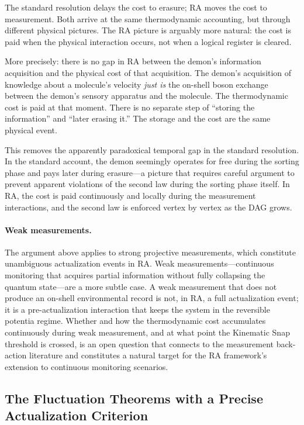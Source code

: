 \documentclass[11pt,a4paper]{article}
\theoremstyle{plain}
\theoremstyle{definition}
\theoremstyle{remark}
\begin{document}
The standard resolution delays the cost to erasure; RA moves the cost to
measurement. Both arrive at the same thermodynamic accounting, but through
different physical pictures. The RA picture is arguably more natural: the cost is
paid when the physical interaction occurs, not when a logical register is cleared.

More precisely: there is no gap in RA between the demon's information acquisition
and the physical cost of that acquisition. The demon's acquisition of knowledge
about a molecule's velocity \emph{just is} the on-shell boson exchange between the
demon's sensory apparatus and the molecule. The thermodynamic cost is paid at that
moment. There is no separate step of ``storing the information'' and ``later
erasing it.'' The storage and the cost are the same physical event.

This removes the apparently paradoxical temporal gap in the standard resolution.
In the standard account, the demon seemingly operates for free during the sorting
phase and pays later during erasure---a picture that requires careful argument to
prevent apparent violations of the second law during the sorting phase itself. In
RA, the cost is paid continuously and locally during the measurement interactions,
and the second law is enforced vertex by vertex as the DAG grows.

\paragraph{Weak measurements.}
The argument above applies to strong projective measurements, which constitute
unambiguous actualization events in RA. Weak measurements---continuous monitoring
that acquires partial information without fully collapsing the quantum state---are
a more subtle case. A weak measurement that does not produce an on-shell
environmental record is not, in RA, a full actualization event; it is a
pre-actualization interaction that keeps the system in the reversible potentia
regime. Whether and how the thermodynamic cost accumulates continuously during
weak measurement, and at what point the Kinematic Snap threshold is crossed, is
an open question that connects to the measurement back-action literature and
constitutes a natural target for the RA framework's extension to continuous
monitoring scenarios.

\subsection{The Fluctuation Theorems with a Precise Actualization Criterion}
\end{document}
